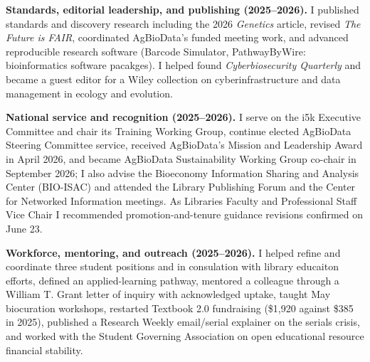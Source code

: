 \textbf{Standards, editorial leadership, and publishing (2025--2026).} I published standards and discovery research including the 2026 \textit{Genetics} article, revised \textit{The Future is FAIR}, coordinated AgBioData's funded meeting work, and advanced reproducible research software (Barcode Simulator, PathwayByWire: bioinformatics software pacakges). I helped found \textit{Cyberbiosecurity Quarterly} and became a guest editor for a Wiley collection on cyberinfrastructure and data management in ecology and evolution.

\textbf{National service and recognition (2025--2026).} I serve on the i5k Executive Committee and chair its Training Working Group, continue elected AgBioData Steering Committee service, received AgBioData's Mission and Leadership Award in April 2026, and became AgBioData Sustainability Working Group co-chair in September 2026; I also advise the Bioeconomy Information Sharing and Analysis Center (BIO-ISAC) and attended the Library Publishing Forum and the Center for Networked Information meetings. As Libraries Faculty and Professional Staff Vice Chair I recommended promotion-and-tenure guidance revisions confirmed on June 23.

\textbf{Workforce, mentoring, and outreach (2025--2026).} I helped refine and coordinate three student positions and in consulation with library educaiton efforts, defined an applied-learning pathway, mentored a colleague through a William T. Grant letter of inquiry with acknowledged uptake, taught May biocuration workshops, restarted Textbook 2.0 fundraising (\$1,920 against \$385 in 2025), published a Research Weekly email/serial explainer on the serials crisis, and worked with the Student Governing Association on open educational resource financial stability.
\par\endgroup
